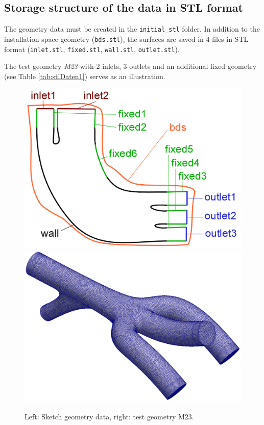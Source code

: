 \documentclass[oneside]{article}
\numberwithin{equation}{section}
\numberwithin{figure}{section}
\numberwithin{figure}{section}
\begin{document}
\subsection{Storage structure of the data in STL format}
The geometry data must be created in the \verb|initial_stl| folder. In addition to the installation space geometry (\texttt{bds.stl}), the surfaces are saved in 4 files in STL format (\texttt{inlet.stl}, \texttt{fixed.stl}, \texttt{wall.stl}, \texttt{outlet.stl}).

The test geometry \textit{M23} with 2 inlets, 3 outlets and an additional fixed geometry (see Table \ref{tab:stlDaten1}) serves as an illustration.

\begin{figure}[htbp]
    \centering
    \includegraphics[scale=0.55]{skizze_designSpace4.png}
    \includegraphics[scale=0.18]{M23all.png}   
    \caption{Left: Sketch geometry data, right: test geometry M23.} 
    \label{fig:sketch building space}
\end{figure}
\end{document}
